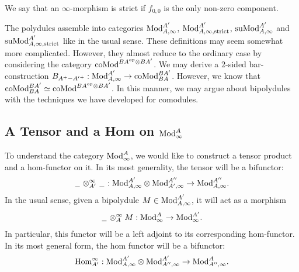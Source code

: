 \documentclass[../thesis.tex]{subfiles}
\begin{document}
            We say that an $\infty$-morphism is strict if $f_{0,0}$ is the only non-zero component.

            The polydules assemble into categories $\tt{Mod}_{A,\infty}^{A'}$, $\tt{Mod}_{A,\infty, \tt{strict}}^{A'}$, $\tt{suMod}_{A,\infty}^{A'}$ and $\tt{suMod}_{A,\infty, \tt{strict}}^{A'}$ like in the usual sense. These definitions may seem somewhat more complicated. However, they almost reduce to the ordinary case by considering the category $\tt{coMod}^{BA^{op}\otimes BA'}$. We may derive a $2$-sided bar-construction $B_{A^+-{A'}^+} : \tt{Mod}_{A,\infty}^{A'} \rightarrow \tt{coMod}^{BA'}_{BA}$. However, we know that $\tt{coMod}_{BA}^{BA'} \simeq \tt{coMod}^{BA^{op}\otimes BA'}$. In this manner, we may argue about bipolydules with the techniques we have developed for comodules.

        \subsection{A Tensor and a Hom on $\tt{Mod}_\infty^A$}

            To understand the category $\tt{Mod}_\infty^A$, we would like to construct a tensor product and a hom-functor on it. In its most generality, the tensor will be a bifunctor:
            \begin{align*}
                \argument \otimes^\infty_{A'} \argument : \tt{Mod}_{A,\infty}^{A'} \otimes \tt{Mod}_{A',\infty}^{A''} \rightarrow \tt{Mod}_{A,\infty}^{A''}\tt{.}
            \end{align*}
            In the usual sense, given a bipolydule $M \in \tt{Mod}_{A,\infty}^{A'}$, it will act as a morphism
            \begin{align*}
                \argument \otimes_A^\infty M : \tt{Mod}_\infty^A \rightarrow \tt{Mod}_\infty^{A'}\tt{.}
            \end{align*}
            In particular, this functor will be a left adjoint to its corresponding hom-functor. In its most general form, the hom functor will be a bifunctor:
            \begin{align*}
                \tt{Hom}^\infty_{A'} : \tt{Mod}_{A,\infty}^{A'}\otimes\tt{Mod}_{A'',\infty}^{A'} \rightarrow \tt{Mod}_{A'',\infty}^{A}\tt{.}
            \end{align*}
\end{document}
